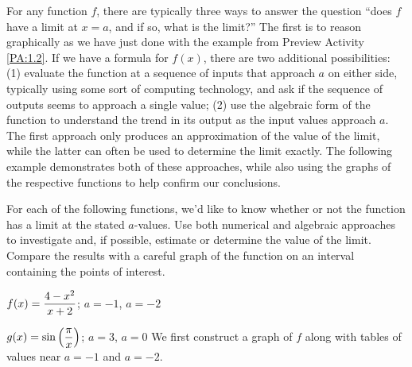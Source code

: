 For any function $f$, there are typically three ways to answer the question ``does $f$ have a limit at $x = a$, and if so, what is the limit?''  The first is to reason graphically as we have just done with the example from Preview Activity \ref{PA:1.2}.  If we have a formula for $f(x)$, there are two additional possibilities:  (1) evaluate the function at a sequence of inputs that approach $a$ on either side, typically using some sort of computing technology, and ask if the sequence of outputs seems to approach a single value; (2) use the algebraic form of the function to understand the trend in its output as the input values approach $a$.  The first approach only produces an approximation of the value of the limit, while the latter can often be used to determine the limit exactly.  The following example demonstrates both of these approaches, while also using the graphs of the respective functions to help confirm our conclusions.

\bex \label{Ex:1.2.Limits}
For each of the following functions, we'd like to know whether or not the function has a limit at the stated $a$-values.  Use both numerical and algebraic approaches to investigate and, if possible, estimate or determine the value of the limit.  Compare the results with a careful graph of the function on an interval containing the points of interest.
\ba
	\item $\displaystyle f(x) = \frac{4-x^2}{x+2}$; $a = -1$, $a = -2$
	\item $\displaystyle g(x) = \sin\left(\frac{\pi}{x}\right)$; $a = 3$, $a = 0$
\ea
\eex
We first construct a graph of $f$ along with tables of values near $a = -1$ and $a = -2$.  

